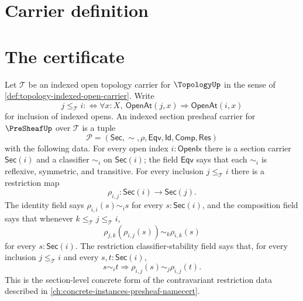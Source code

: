 \section{Carrier definition}
\label{sec:sheaf-carrier}

\section{The certificate}
\label{sec:sheaf-certificate}

\begin{definition}
\label{def:sheaf-indexed-section-presheaf-carrier}
Let $\mathcal{T}$ be an indexed open topology carrier for $\TopologyUp$ in the sense of \autoref{def:topology-indexed-open-carrier}. Write
$$
j\le_{\mathcal{T}} i
:\Longleftrightarrow
\forall x:X,\ \mathsf{OpenAt}(j,x)\Longrightarrow\mathsf{OpenAt}(i,x)
$$
for inclusion of indexed opens. An indexed section presheaf carrier for $\PreSheafUp$ over $\mathcal{T}$ is a tuple
$$
\mathcal{P}=(\mathsf{Sec},\sim,\rho,\mathsf{Eqv},\mathsf{Id},\mathsf{Comp},\mathsf{Res})
$$
with the following data. For every open index $i:\mathsf{OpenIx}$ there is a section carrier $\mathsf{Sec}(i)$ and a classifier $\sim_i$ on $\mathsf{Sec}(i)$; the field $\mathsf{Eqv}$ says that each $\sim_i$ is reflexive, symmetric, and transitive. For every inclusion $j\le_{\mathcal{T}} i$ there is a restriction map
$$
\rho_{i,j}:\mathsf{Sec}(i)\to\mathsf{Sec}(j).
$$
The identity field says $\rho_{i,i}(s)\sim_i s$ for every $s:\mathsf{Sec}(i)$, and the composition field says that whenever $k\le_{\mathcal{T}}j\le_{\mathcal{T}}i$,
$$
\rho_{j,k}(\rho_{i,j}(s))\sim_k\rho_{i,k}(s)
$$
for every $s:\mathsf{Sec}(i)$. The restriction classifier-stability field says that, for every inclusion $j\le_{\mathcal{T}}i$ and every $s,t:\mathsf{Sec}(i)$,
$$
s\sim_i t
\Longrightarrow
\rho_{i,j}(s)\sim_j\rho_{i,j}(t).
$$
This is the section-level concrete form of the contravariant restriction data described in \autoref{ch:concrete-instances-presheaf-namecert}.
\end{definition}

